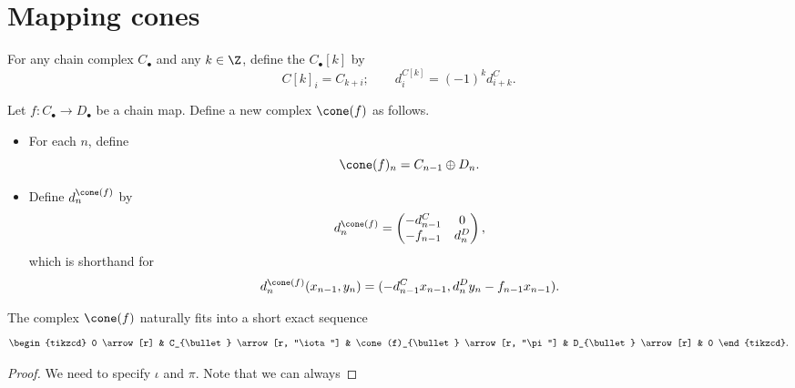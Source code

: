 \documentclass[main.tex]{subfiles}
\begin{document}
\section{Mapping cones}
\label{sec:mapping_cones}

\begin{definition}
  \label{def:shift_functor}
  For any chain complex $C_{\bullet}$ and any $k \in \Z$, define the  $C_{\bullet}[k]$ by
  \begin{equation*}
    C[k]_{i} = C_{k+i};\qquad d^{C[k]}_{i} = (-1)^{k}d^{C}_{i+k}.
  \end{equation*}
\end{definition}

\begin{definition}
  \label{def:mapping_cone}
  Let $f\colon C_{\bullet} \to D_{\bullet}$ be a chain map. Define a new complex $\cone(f)$ as follows.
  \begin{itemize}
    \item For each $n$, define
      \begin{equation*}
        \cone(f)_{n} = C_{n-1} \oplus D_{n}.
      \end{equation*}

    \item Define $d^{\cone(f)}_{n}$ by
      \begin{equation*}
        d^{\cone(f)}_{n} =
        \begin{pmatrix}
          -d^{C}_{n-1} & 0 \\
          -f_{n-1} & d^{D}_{n}
        \end{pmatrix},
      \end{equation*}
      which is shorthand for
      \begin{equation*}
        d^{\cone(f)}_{n}(x_{n-1}, y_{n}) = (-d^{C}_{n-1}x_{n-1}, d^{D}_{n}y_{n} - f_{n-1}x_{n-1}).
      \end{equation*}
  \end{itemize}
\end{definition}

\begin{lemma}
  \label{lemma:cone_fits_into_ses}
  The complex $\cone(f)$ naturally fits into a short exact sequence
  \begin{equation*}
    \begin{tikzcd}
      0
      \arrow[r]
      & C_{\bullet}
      \arrow[r, "\iota"]
      & \cone(f)_{\bullet}
      \arrow[r, "\pi"]
      & D_{\bullet}
      \arrow[r]
      & 0
    \end{tikzcd}.
  \end{equation*}
\end{lemma}
\begin{proof}
  We need to specify $\iota$ and $\pi$. Note that we can always
\end{proof}
\end{document}
